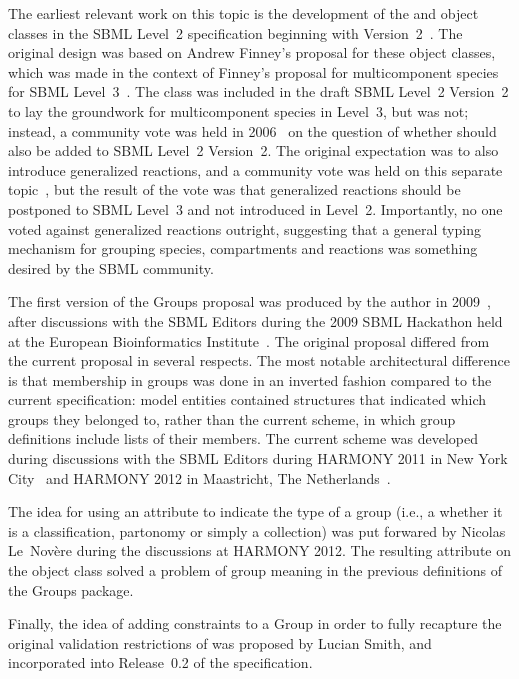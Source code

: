 The earliest relevant work on this topic is the development of the \CompartmentType and \SpeciesType object classes in the SBML Level~2 specification beginning with Version~2~\citep{l2v2}. The original design was based on Andrew Finney's proposal for these object classes, which was made in the context of Finney's proposal for multicomponent species for SBML Level~3~\citep{finney_2004}. The \SpeciesType class was included in the draft SBML Level~2 Version~2 to lay the groundwork for multicomponent species in Level~3, but  was not; instead, a community vote was held in 2006~\citep{vote_2006} on the question of whether  should also be added to SBML Level~2 Version~2. The original expectation was to also introduce generalized reactions, and a community vote was held on this separate topic~\citep{vote_2006b}, but the result of the vote was that generalized reactions should be postponed to SBML Level~3 and not introduced in Level~2. Importantly, no one voted against generalized reactions outright, suggesting that a general typing mechanism for grouping species, compartments and reactions was something desired by the SBML community.

The first version of the Groups proposal was produced by the author in 2009~\citep{hucka_2009}, after discussions with the SBML Editors during the 2009 SBML Hackathon held at the European Bioinformatics Institute~\citep{sbml_hackathon_2009}.  The original proposal differed from the current proposal in several respects. The most notable architectural difference is that membership in groups was done in an inverted fashion compared to the current specification: model entities contained structures that indicated which groups they belonged to, rather than the current scheme, in which group definitions include lists of their members.  The current scheme was developed during discussions with the SBML Editors during HARMONY 2011 in New York City~\citep{harmony_2011} and HARMONY 2012 in Maastricht, The Netherlands~\citep{harmony_2012}.

The idea for using an attribute to indicate the type of a group (i.e., a whether it is a classification, partonomy or simply a collection) was put forwared by Nicolas Le~Nov\`{e}re during the discussions at HARMONY 2012.  The resulting attribute  on the \Group object class solved a problem of group meaning in the previous definitions of the Groups package.

Finally, the idea of adding constraints to a Group in order to fully recapture the original validation restrictions of \SpeciesType was proposed by Lucian Smith, and incorporated into Release~0.2 of the specification.
